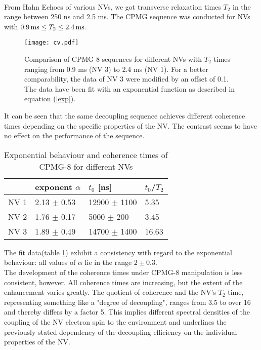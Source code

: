 \documentclass[12pt,a4paper]{article}
\begin{document}
\\
From Hahn Echoes of various NVs, we got transverse relaxation times $T_2$ in the range between 250 ns and 2.5 ms. The CPMG sequence was conducted for NVs with $\unit[0.9]{ms}\leq T_2\leq\unit[2.4]{ms}$. 
\begin{figure}[H]
\texttt{[image: cv.pdf]} 
\caption{Comparison of CPMG-8 sequences for different NVs with $T_2$ times ranging from 0.9 ms (NV 3) to 2.4 ms (NV 1). For a better comparability, the data of NV 3 were modified by an offset of 0.1. The data have been fit with an exponential function as described in equation (\ref{exp}).}
\label{C8}
\end{figure}
It can be seen that the same decoupling sequence achieves different coherence times depending on the specific properties of the NV. The contrast seems to have no effect on the performance of the sequence.\\
\begin{table}[H]
\centering
\caption{Exponential behaviour and coherence times of CPMG-8 for different NVs}
\label{cv}
\begin{tabular}{l|ll|l}
&exponent $\alpha$ & $t_0$ {[}ns{]}                     & $t_0$/$T_2$             \\\hline
NV 1            & 2.13          $\pm$ 0.53 & 12900            $\pm$ 1100         & 5.35 \\
NV 2            & 1.76         $\pm$ 0.17  & 5000           $\pm$ 200       & 3.45 \\
NV 3            & 1.89         $\pm$ 0.49 & 14700         $\pm$ 1400         & 16.63
\end{tabular}
\end{table}
The fit data(table \ref{cv}) exhibit a consistency with regard to the exponential behaviour: all values of $\alpha$ lie in the range $2\pm0.3$.  
\\
The development of the coherence times under CPMG-8 manipulation is less consistent, however. All coherence times are increasing, but the extent of the enhancement varies greatly. The quotient of coherence and the NV's $T_2$ time, representing something like a "degree of decoupling", ranges from 3.5 to over 16 and thereby differs by a factor 5. This implies different spectral densities of the coupling of the NV electron spin to the environment and underlines the previously stated dependency of the decoupling efficiency on the individual properties of the NV.
\end{document}
